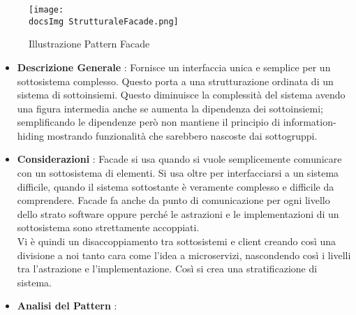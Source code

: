 {{{			\begin{figure}[h]
				\centering
				\texttt{[image: \\docsImg StrutturaleFacade.png]}
				\caption{Illustrazione Pattern Facade}
				\label{Illustrazione Pattern Facade}
			\end{figure}
			
			\begin{itemize}\itemsep1pt
				\item \textbf{Descrizione Generale} : Fornisce un interfaccia unica e semplice per un sottosistema complesso. Questo porta a una strutturazione ordinata di un sistema di sottoinsiemi. Questo diminuisce la complessità del sistema avendo una figura intermedia anche se aumenta la dipendenza dei sottoinsiemi; semplificando le dipendenze però non mantiene il principio di information-hiding mostrando funzionalità che sarebbero nascoste dai sottogruppi.
				\item \textbf{Considerazioni} : Facade si usa quando si vuole semplicemente comunicare con un sottosistema di elementi. Si usa oltre per interfacciarsi a un sistema difficile, quando il sistema sottostante è veramente complesso e difficile da comprendere. Facade fa anche da punto di comunicazione per ogni livello dello strato software oppure perché le astrazioni e le implementazioni di un sottosistema sono strettamente accoppiati.\\
				Vi è quindi un disaccoppiamento tra sottosistemi e client creando così una divisione a noi tanto cara come l'idea a microservizi, nascondendo così i livelli tra l'astrazione e l'implementazione. Così si crea una stratificazione di sistema.
				\item \textbf{Analisi del Pattern} : \hfill
				

\end{itemize}}}}
